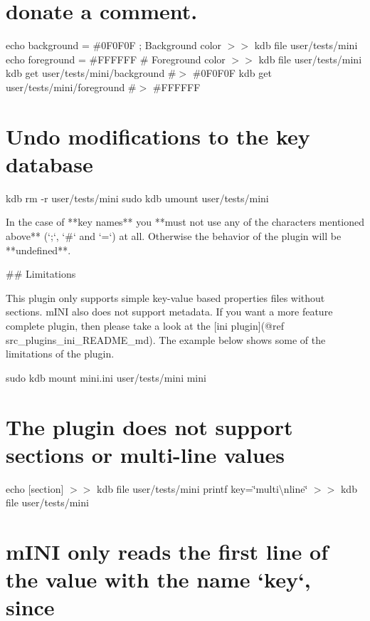 \hypertarget{autotoc_md404_autotoc_md419}{}\section{donate a comment.}\label{autotoc_md404_autotoc_md419}
echo \textquotesingle{}background = \#0\+F0\+F0F ; Background color\textquotesingle{} $>$$>$ {\ttfamily kdb file user/tests/mini} echo \textquotesingle{}foreground = \#F\+F\+F\+F\+FF \# Foreground color\textquotesingle{} $>$$>$ {\ttfamily kdb file user/tests/mini} kdb get user/tests/mini/background \#$>$ \#0\+F0\+F0F kdb get user/tests/mini/foreground \#$>$ \#\+F\+F\+F\+F\+FF\hypertarget{autotoc_md404_autotoc_md420}{}\section{Undo modifications to the key database}\label{autotoc_md404_autotoc_md420}
kdb rm -\/r user/tests/mini sudo kdb umount user/tests/mini 
\begin{DoxyCode}
In the case of **key names** you **must not use any of the characters mentioned above** (`;`, `#` and `=`)
       at all. Otherwise the behavior of the plugin will be **undefined**.

## Limitations

This plugin only supports simple key-value based properties files without sections. mINI also does not
       support metadata. If you want a more feature complete plugin, then please take a look at the [ini plugin](@ref
       src\_plugins\_ini\_README\_md). The example below shows some of the limitations of the plugin.
\end{DoxyCode}
 sudo kdb mount mini.\+ini user/tests/mini mini\hypertarget{autotoc_md404_autotoc_md421}{}\section{The plugin does not support sections or multi-\/line values}\label{autotoc_md404_autotoc_md421}
echo \textquotesingle{}\mbox{[}section\mbox{]}\textquotesingle{} $>$$>$ {\ttfamily kdb file user/tests/mini} printf \textquotesingle{}key=\char`\"{}multi\textbackslash{}nline\char`\"{}\textquotesingle{} $>$$>$ {\ttfamily kdb file user/tests/mini}\hypertarget{autotoc_md404_autotoc_md422}{}\section{m\+I\+N\+I only reads the first line of the value with the name `key`, since}\label{autotoc_md404_autotoc_md422}
